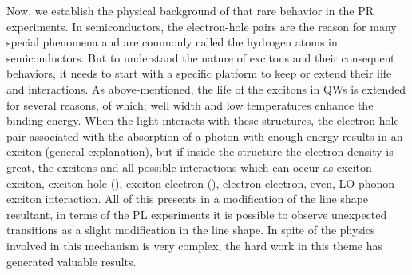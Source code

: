 Now, we establish the physical background of that rare behavior in the PR experiments. In semiconductors, the electron-hole pairs are the reason for many special phenomena and are commonly called the hydrogen atoms in semiconductors. But to understand the nature of excitons and their consequent behaviors, it needs to start with a specific platform to keep or extend their life and interactions.  As above-mentioned, the life of the excitons in QWs is extended for several reasons, of which; well width and low temperatures enhance the binding energy\cite{bastard1982exciton,shinozuka1983wannier}. When the light interacts with these structures, the electron-hole pair associated with the absorption of a photon with enough energy results in an exciton (general explanation), but if inside the structure the electron density is great\cite{kheng1993observation}, the excitons and all possible interactions which can occur as exciton-exciton, exciton-hole (\xm), exciton-electron (\xp), electron-electron, even, LO-phonon-exciton interaction. 
All of this presents in a modification of the line shape resultant, in terms of the PL experiments it is possible to observe unexpected transitions as a slight modification in the line shape. In spite of the physics involved in this mechanism is very complex, the hard work in this theme has generated valuable results. 

